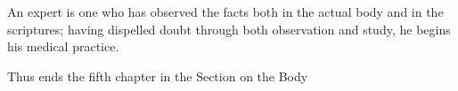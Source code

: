 \begin{translation}
\begin{tt}
\item[51]
An expert is one who has observed the facts both in the actual body and in the scriptures; having dispelled doubt through both observation and study, he begins his medical practice. 

Thus ends the fifth chapter in the Section on the Body
\end{tt}
\end{translation}